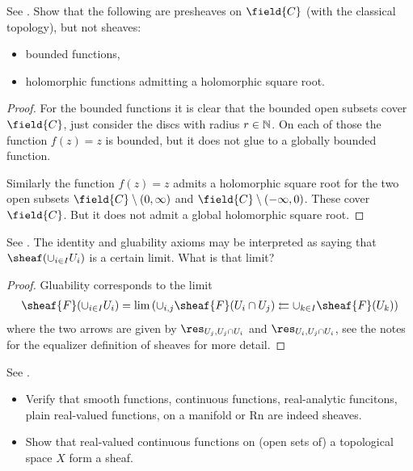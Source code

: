 \begin{exercise}[2.2.B]
  See \cite[2.2.B]{vakil2024the-rising-sea}.
  Show that the following are presheaves on $\field{C}$ (with the
  classical topology), but not sheaves:
  \begin{itemize}
  \item bounded functions,
  \item holomorphic functions admitting a holomorphic square root.
  \end{itemize}
\end{exercise}

\begin{proof}
  For the bounded functions it is clear that the bounded open subsets
  cover $\field{C}$, just consider the discs with radius $r\in
  \mathbb{N}$. On each of those the function $f(z)=z$ is bounded, but
  it does not glue to a globally bounded function.

  Similarly the function $f(z)=z$ admits a holomorphic square root for
  the two open subsets $\field{C}\setminus (0 , \infty)$ and
  $\field{C}\setminus (-\infty ,0)$. These cover $\field{C}$. But it
  does not admit a global holomorphic square root.
\end{proof}

\begin{exercise}[2.2.C]
  See \cite[2.2.C]{vakil2024the-rising-sea}.
  The identity and gluability axioms may be interpreted as saying that
  $\sheaf(\cup_{i\in I}U_i)$ is a certain limit. What is that limit?
\end{exercise}

\begin{proof}
  Gluability corresponds to the limit
  \begin{align*}
    \sheaf{F}(\cup_{i\in I}U_i) = \lim \left(
    \cup_{i,j}\sheaf{F}(U_i\cap U_j) \leftleftarrows \cup_{k\in I} \sheaf{F}(U_k) \right)
  \end{align*}
  where the two arrows are given by $\res_{U_j,U_j\cap U_i}$ and
  $\res_{U_i,U_j\cap U_i}$, see the notes for the equalizer definition
  of sheaves for more detail.
\end{proof}

\begin{exercise}[2.2.D]
  See \cite[2.2.D]{vakil2024the-rising-sea}.
  \begin{itemize}
  \item Verify that smooth functions, continuous functions, real-analytic
    funcitons, plain real-valued functions, on a manifold or Rn are
    indeed sheaves.
  \item Show that real-valued continuous functions on (open sets of) a topological space $X$ form a sheaf.
  \end{itemize}
\end{exercise}

